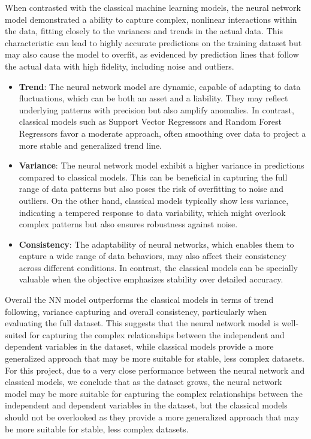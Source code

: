 When contrasted with the classical machine learning models, the neural network model demonstrated a ability to capture complex, nonlinear interactions within the data, fitting closely to the 
variances and trends in the actual data. This characteristic can lead to highly accurate predictions on the training dataset but may also cause the model to overfit, as evidenced by prediction 
lines that follow the actual data with high fidelity, including noise and outliers.

\begin{itemize}
    \item \textbf{Trend}: The neural network model are dynamic, capable of adapting to data fluctuations, which can be both an asset and a liability. They may reflect underlying patterns with precision but also amplify 
    anomalies. In contrast, classical models such as Support Vector Regressors and Random Forest Regressors favor a moderate approach, often smoothing over data to project a more stable and generalized trend line.
    
    \item \textbf{Variance}: The neural network model exhibit a higher variance in predictions compared to classical models. This can be beneficial in capturing the full range of data patterns but 
    also poses the risk of overfitting to noise and outliers. On the other hand, classical models typically show less variance, indicating a tempered response to data variability, which might overlook 
    complex patterns but also ensures robustness against noise.

    \item \textbf{Consistency}: The adaptability of neural networks, which enables them to capture a wide range of data behaviors, may also affect their consistency across different conditions.
    In contrast, the classical models can be specially valuable when the objective emphasizes stability over detailed accuracy.
    

\end{itemize}


Overall the NN model outperforms the classical models in terms of trend following, variance capturing and overall consistency, particularly when evaluating the full dataset. This suggests that 
the neural network model is well-suited for capturing the complex relationships between the independent and dependent variables in the dataset, while classical models provide a more generalized
approach that may be more suitable for stable, less complex datasets.
For this project, due to a very close performance between the neural network and classical models, we conclude that as the dataset grows, the neural network model may be more suitable for capturing
the complex relationships between the independent and dependent variables in the dataset, but the classical models should not be overlooked as they provide a more generalized approach that may
be more suitable for stable, less complex datasets.

